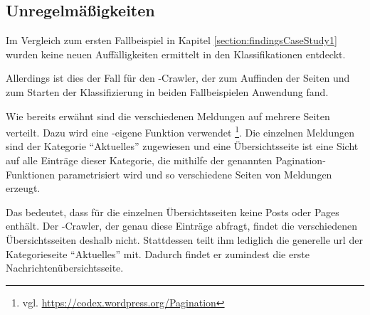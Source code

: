 \subsection{Unregelmäßigkeiten}
    Im Vergleich zum ersten Fallbeispiel in Kapitel \ref{section:findingsCaseStudy1}
    wurden keine neuen Auffälligkeiten ermittelt in den Klassifikationen entdeckt.

    Allerdings ist dies der Fall für den {\wordpress}-Crawler,
    der zum Auffinden der Seiten und zum Starten der Klassifizierung
    in beiden Fallbeispielen Anwendung fand.

    Wie bereits erwähnt sind die verschiedenen Meldungen auf mehrere Seiten verteilt.
    Dazu wird eine {\wordpress}-eigene Funktion verwendet
    \footnote{vgl. \url{https://codex.wordpress.org/Pagination}}.
    Die einzelnen Meldungen sind der Kategorie "`Aktuelles"' zugewiesen
    und eine Übersichtsseite ist eine Sicht auf alle Einträge
    dieser Kategorie, die mithilfe der genannten Pagination-Funktionen
    parametrisiert wird und so verschiedene Seiten von Meldungen erzeugt.

    Das bedeutet, dass {\wordpress} für die einzelnen Übersichtsseiten keine Posts oder Pages enthält.
    Der {\wordpress}-Crawler, der genau diese Einträge abfragt,
    findet die verschiedenen Übersichtsseiten deshalb nicht.
    Stattdessen teilt ihm {\wordpress} lediglich die
    generelle \gls{url} der Kategorieseite "`Aktuelles"' mit.
    Dadurch findet er zumindest die erste Nachrichtenübersichtsseite.